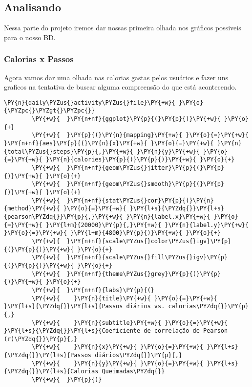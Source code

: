 \subsection{Analisando}

Nessa parte do projeto iremos dar nossas primeira olhada nos gráficos
possiveis para o nosso BD.

\subsubsection{Calorias x Passos}

Agora vamos dar uma olhada nas calorias gastas pelos usuários e fazer
uns graficos na tentativa de buscar alguma compreensão do que está
acontecendo.

\begin{tcolorbox}[breakable, size=fbox, boxrule=1pt, pad at break*=1mm,colback=cellbackground, colframe=cellborder]
    \begin{Verbatim}[commandchars=\\\{\}]
        \PY{n}{daily\PYZus{}activity\PYZus{}file}\PY{+w}{ }\PY{o}{\PYZpc{}\PYZgt{}\PYZpc{}}
        \PY{+w}{  }\PY{n+nf}{ggplot}\PY{p}{(}\PY{p}{)}\PY{+w}{ }\PY{o}{+}
        \PY{+w}{  }\PY{p}{(}\PY{n}{mapping}\PY{+w}{ }\PY{o}{=}\PY{+w}{ }\PY{n+nf}{aes}\PY{p}{(}\PY{n}{x}\PY{+w}{ }\PY{o}{=}\PY{+w}{ }\PY{n}{total\PYZus{}steps}\PY{p}{,}\PY{+w}{ }\PY{n}{y}\PY{+w}{ }\PY{o}{=}\PY{+w}{ }\PY{n}{calories}\PY{p}{)}\PY{p}{)}\PY{+w}{ }\PY{o}{+}
        \PY{+w}{  }\PY{n+nf}{geom\PYZus{}jitter}\PY{p}{(}\PY{p}{)}\PY{+w}{ }\PY{o}{+}
        \PY{+w}{  }\PY{n+nf}{geom\PYZus{}smooth}\PY{p}{(}\PY{p}{)}\PY{+w}{ }\PY{o}{+}
        \PY{+w}{  }\PY{n+nf}{stat\PYZus{}cor}\PY{p}{(}\PY{n}{method}\PY{+w}{ }\PY{o}{=}\PY{+w}{ }\PY{l+s}{\PYZdq{}}\PY{l+s}{pearson\PYZdq{}}\PY{p}{,}\PY{+w}{ }\PY{n}{label.x}\PY{+w}{ }\PY{o}{=}\PY{+w}{ }\PY{l+m}{20000}\PY{p}{,}\PY{+w}{ }\PY{n}{label.y}\PY{+w}{ }\PY{o}{=}\PY{+w}{ }\PY{l+m}{4800}\PY{p}{)}\PY{+w}{ }\PY{o}{+}
        \PY{+w}{  }\PY{n+nf}{scale\PYZus{}color\PYZus{}igv}\PY{p}{(}\PY{p}{)}\PY{+w}{ }\PY{o}{+}
        \PY{+w}{  }\PY{n+nf}{scale\PYZus{}fill\PYZus{}igv}\PY{p}{(}\PY{p}{)}\PY{+w}{ }\PY{o}{+}
        \PY{+w}{  }\PY{n+nf}{theme\PYZus{}grey}\PY{p}{(}\PY{p}{)}\PY{+w}{ }\PY{o}{+}
        \PY{+w}{  }\PY{n+nf}{labs}\PY{p}{(}
        \PY{+w}{    }\PY{n}{title}\PY{+w}{ }\PY{o}{=}\PY{+w}{ }\PY{l+s}{\PYZdq{}}\PY{l+s}{Passos diários vs. calorias\PYZdq{}}\PY{p}{,}
        \PY{+w}{    }\PY{n}{subtitle}\PY{+w}{ }\PY{o}{=}\PY{+w}{ }\PY{l+s}{\PYZdq{}}\PY{l+s}{Coeficiente de correlação de Pearson (r)\PYZdq{}}\PY{p}{,}
        \PY{+w}{    }\PY{n}{x}\PY{+w}{ }\PY{o}{=}\PY{+w}{ }\PY{l+s}{\PYZdq{}}\PY{l+s}{Passos diários\PYZdq{}}\PY{p}{,}
        \PY{+w}{    }\PY{n}{y}\PY{+w}{ }\PY{o}{=}\PY{+w}{ }\PY{l+s}{\PYZdq{}}\PY{l+s}{Calorias Queimadas\PYZdq{}}
        \PY{+w}{  }\PY{p}{)}
    \end{Verbatim}
\end{tcolorbox}


